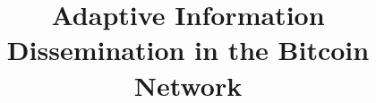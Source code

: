 \documentclass{dads}   %
\begin{document}

\title{Adaptive Information Dissemination in the Bitcoin Network}


%
%
%
%
%
\end{document}
